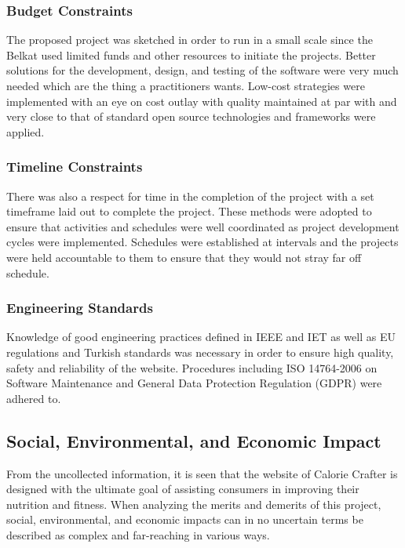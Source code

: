 \documentclass[a4paper,12pt]{article}
\begin{document}
\subsubsection{Budget Constraints}
The proposed project was sketched in order to run in a small scale since the Belkat used limited funds and other resources to initiate the projects. Better solutions for the development, design, and testing of the software were very much needed which are the thing a practitioners wants. Low-cost strategies were implemented with an eye on cost outlay with quality maintained at par with and very close to that of standard open source technologies and frameworks were applied.

\subsubsection{Timeline Constraints}
There was also a respect for time in the completion of the project with a set timeframe laid out to complete the project. These methods were adopted to ensure that activities and schedules were well coordinated as project development cycles were implemented. Schedules were established at intervals and the projects were held accountable to them to ensure that they would not stray far off schedule.

\subsubsection{Engineering Standards}
Knowledge of good engineering practices defined in IEEE and IET as well as EU regulations and Turkish standards was necessary in order to ensure high quality, safety and reliability of the website. Procedures including ISO 14764-2006 on Software Maintenance and General Data Protection Regulation (GDPR) were adhered to.



\subsection{Social, Environmental, and Economic Impact}
From the uncollected information, it is seen that the website of Calorie Crafter is designed with the ultimate goal of assisting consumers in improving their nutrition and fitness. When analyzing the merits and demerits of this project, social, environmental, and economic impacts can in no uncertain terms be described as complex and far-reaching in various ways.
\end{document}
